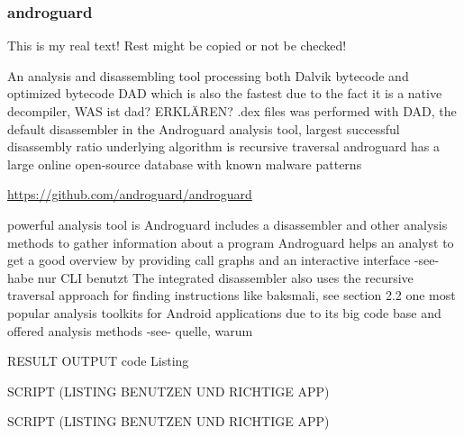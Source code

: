 \subsubsection{androguard} \label{subsection:forensics-tools-java-androguard}
This is my real text! Rest might be copied or not be checked!

%
An analysis and disassembling tool processing both Dalvik bytecode and optimized bytecode\newline
DAD which is also the fastest due to the fact it is a native decompiler, WAS ist dad? ERKLÄREN? .dex files was performed with DAD, the default disassembler
in the Androguard analysis tool, largest successful disassembly
ratio\newline
underlying algorithm is recursive traversal\newline
androguard has a large online open-source database with known malware patterns\newline
\cite{kovachevaMaster}
%




\url{https://github.com/androguard/androguard}

powerful analysis tool is Androguard\newline
includes a disassembler and other analysis methods to gather information about a program\newline
Androguard helps an analyst to get a good overview by providing call graphs and an interactive interface -see- habe nur CLI benutzt\newline
The integrated disassembler also uses the recursive traversal approach for finding instructions like baksmali, see section 2.2\newline
one most popular analysis toolkits for Android applications due to its big code base and offered analysis methods -see- quelle, warum\newline


RESULT OUTPUT
code Listing

SCRIPT (LISTING BENUTZEN UND RICHTIGE APP)

SCRIPT (LISTING BENUTZEN UND RICHTIGE APP)


